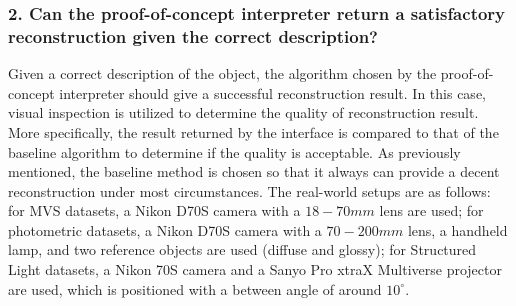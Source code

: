

\subsubsection{2. Can the proof-of-concept interpreter return a satisfactory reconstruction given the correct description?}
Given a correct description of the object, the algorithm chosen by the proof-of-concept interpreter should give a successful reconstruction result. In this case, visual inspection is utilized to determine the quality of reconstruction result. More specifically, the result returned by the interface is compared to that of the baseline algorithm to determine if the quality is acceptable. As previously mentioned, the baseline method is chosen so that it always can provide a decent reconstruction under most circumstances. The real-world setups are as follows: for MVS datasets, a Nikon D70S camera with a $18-70mm$ lens are used; for photometric datasets, a Nikon D70S camera with a $70-200mm$ lens, a handheld lamp, and two reference objects are used (diffuse and glossy); for Structured Light datasets, a Nikon 70S camera and a Sanyo Pro xtraX Multiverse projector are used, which is positioned with a between angle of around $10^\circ$.




